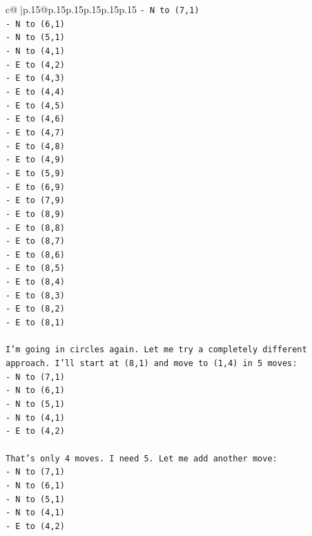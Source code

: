 \documentclass{article}
\begin{document}
{\begin{supertabular}{c@{$\;$}|p{.15\linewidth}@{}p{.15\linewidth}p{.15\linewidth}p{.15\linewidth}p{.15\linewidth}p{.15\linewidth}}
{{{\texttt{{-} N to (7,1)} \\
\texttt{{-} N to (6,1)} \\
\texttt{{-} N to (5,1)} \\
\texttt{{-} N to (4,1)} \\
\texttt{{-} E to (4,2)} \\
\texttt{{-} E to (4,3)} \\
\texttt{{-} E to (4,4)} \\
\texttt{{-} E to (4,5)} \\
\texttt{{-} E to (4,6)} \\
\texttt{{-} E to (4,7)} \\
\texttt{{-} E to (4,8)} \\
\texttt{{-} E to (4,9)} \\
\texttt{{-} E to (5,9)} \\
\texttt{{-} E to (6,9)} \\
\texttt{{-} E to (7,9)} \\
\texttt{{-} E to (8,9)} \\
\texttt{{-} E to (8,8)} \\
\texttt{{-} E to (8,7)} \\
\texttt{{-} E to (8,6)} \\
\texttt{{-} E to (8,5)} \\
\texttt{{-} E to (8,4)} \\
\texttt{{-} E to (8,3)} \\
\texttt{{-} E to (8,2)} \\
\texttt{{-} E to (8,1)} \\
\\ 
\texttt{I'm going in circles again. Let me try a completely different approach. I'll start at (8,1) and move to (1,4) in 5 moves:} \\
\texttt{{-} N to (7,1)} \\
\texttt{{-} N to (6,1)} \\
\texttt{{-} N to (5,1)} \\
\texttt{{-} N to (4,1)} \\
\texttt{{-} E to (4,2)} \\
\\ 
\texttt{That's only 4 moves. I need 5. Let me add another move:} \\
\texttt{{-} N to (7,1)} \\
\texttt{{-} N to (6,1)} \\
\texttt{{-} N to (5,1)} \\
\texttt{{-} N to (4,1)} \\
\texttt{{-} E to (4,2)} \\
}}}
\end{supertabular}}
\end{document}
